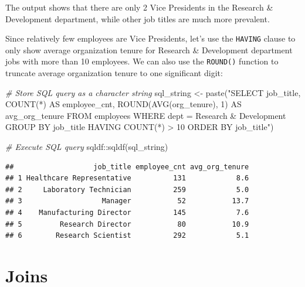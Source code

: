 \documentclass[
]{book}
\newenvironment{Shaded}{\begin{snugshade}}{\end{snugshade}}
\newcommand{\CommentTok}[1]{\textcolor[rgb]{0.56,0.35,0.01}{\textit{#1}}}
\newcommand{\FunctionTok}[1]{\textcolor[rgb]{0.00,0.00,0.00}{#1}}
\newcommand{\NormalTok}[1]{#1}
\newcommand{\OtherTok}[1]{\textcolor[rgb]{0.56,0.35,0.01}{#1}}
\newcommand{\SpecialCharTok}[1]{\textcolor[rgb]{0.00,0.00,0.00}{#1}}
\newcommand{\StringTok}[1]{\textcolor[rgb]{0.31,0.60,0.02}{#1}}
\begin{document}
The output shows that there are only 2 Vice Presidents in the Research \& Development department, while other job titles are much more prevalent.

Since relatively few employees are Vice Presidents, let's use the \texttt{HAVING} clause to only show average organization tenure for Research \& Development department jobs with more than 10 employees. We can also use the \texttt{ROUND()} function to truncate average organization tenure to one significant digit:

\begin{Shaded}
\begin{Highlighting}[]
\CommentTok{\# Store SQL query as a character string}
\NormalTok{sql\_string }\OtherTok{\textless{}{-}} \FunctionTok{paste}\NormalTok{(}\StringTok{"SELECT}
\StringTok{                      job\_title,}
\StringTok{                      COUNT(*) AS employee\_cnt,}
\StringTok{                      ROUND(AVG(org\_tenure), 1) AS avg\_org\_tenure}
\StringTok{                    FROM}
\StringTok{                      employees}
\StringTok{                    WHERE}
\StringTok{                      dept = \textquotesingle{}Research \& Development\textquotesingle{}}
\StringTok{                    GROUP BY}
\StringTok{                      job\_title}
\StringTok{                    HAVING}
\StringTok{                      COUNT(*) \textgreater{} 10}
\StringTok{                    ORDER BY}
\StringTok{                      job\_title"}\NormalTok{)}

\CommentTok{\# Execute SQL query}
\NormalTok{sqldf}\SpecialCharTok{::}\FunctionTok{sqldf}\NormalTok{(sql\_string)}
\end{Highlighting}
\end{Shaded}

\begin{verbatim}
##                   job_title employee_cnt avg_org_tenure
## 1 Healthcare Representative          131            8.6
## 2     Laboratory Technician          259            5.0
## 3                   Manager           52           13.7
## 4    Manufacturing Director          145            7.6
## 5         Research Director           80           10.9
## 6        Research Scientist          292            5.1
\end{verbatim}

\hypertarget{joins}{%
\section{Joins}\label{joins}}
\end{document}
